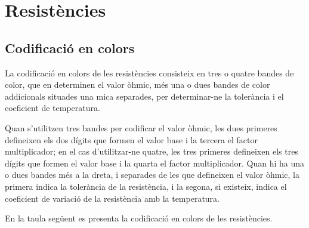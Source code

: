 \chapter{Resistències}\label{chap:resistencies}

\section{Codificació en colors} 

La codificació en colors  de les resistències
consisteix en tres o quatre bandes de color, que en determinen el  valor òhmic, més una o dues bandes de color addicionals situades una mica separades, per determinar-ne la tolerància i el coeficient de temperatura.

Quan s'utilitzen tres bandes per codificar  el valor òhmic, les dues primeres defineixen els dos dígits que formen el valor
base i la tercera el factor  multiplicador; en el cas d'utilitzar-ne quatre, les tres primeres defineixen els tres dígits que formen el valor base i la quarta  el factor multiplicador. Quan hi ha una o dues bandes més a la dreta, i separades de les que defineixen el valor òhmic, la primera indica la tolerància de la resistència, i la segona, si existeix, indica el coeficient de variació de la resistència  amb la temperatura.

En la taula següent es presenta la codificació en colors de les resistències.


